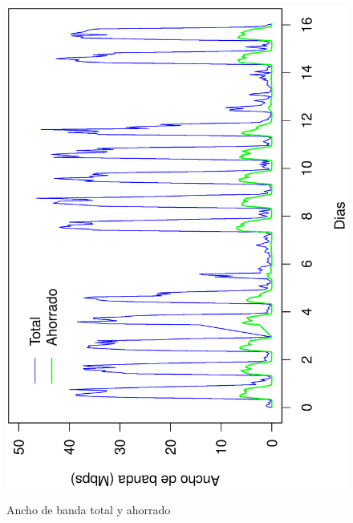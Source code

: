 \documentclass[twocolumn]{Jornadas}
\begin{document}
\begin{figure}[ht!]
\includegraphics[scale=0.30,angle=-90]{figures/Bandwidth_full.eps}\label{fig:ahorrado}
\caption{Ancho de banda total y ahorrado}
\label{fig:ahorrado}
\end{figure}
\end{document}
